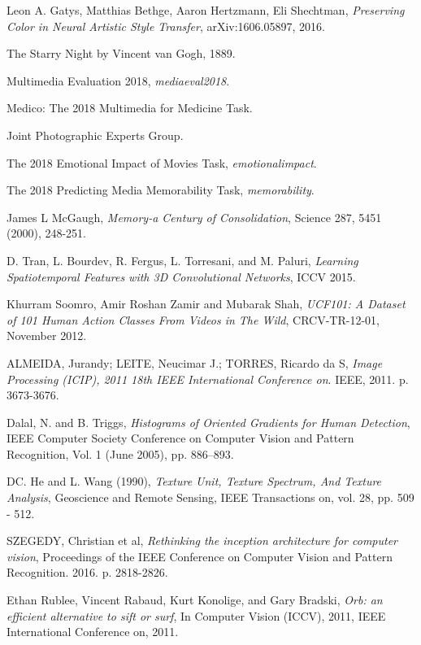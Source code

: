 \begin{thebibliography}{}
	Leon A. Gatys, Matthias Bethge, Aaron Hertzmann, Eli Shechtman,
    \emph{Preserving Color in Neural Artistic Style Transfer},
    arXiv:1606.05897, 2016.

	The Starry Night by Vincent van Gogh,
	1889.


	Multimedia Evaluation 2018,
    \emph{mediaeval2018}.

	Medico: The 2018 Multimedia for Medicine Task.

	Joint Photographic Experts Group.

	The 2018 Emotional Impact of Movies Task,
    \emph{emotionalimpact}.

	The 2018 Predicting Media Memorability Task,
	\emph{memorability}.

	James L McGaugh,
    \emph{Memory-a Century of Consolidation},
	Science 287, 5451 (2000), 248-251.

	D. Tran, L. Bourdev, R. Fergus, L. Torresani, and M. Paluri,
    \emph{Learning Spatiotemporal Features with 3D Convolutional Networks},
    ICCV 2015.

	Khurram Soomro, Amir Roshan Zamir and Mubarak Shah,
	\emph{UCF101: A Dataset of 101 Human Action Classes From Videos in The Wild},
	CRCV-TR-12-01,
	November 2012.

	ALMEIDA, Jurandy; LEITE, Neucimar J.; TORRES, Ricardo da S,
    \emph{Image Processing (ICIP), 2011 18th IEEE International Conference on}.
    IEEE, 2011. p. 3673-3676.

	Dalal, N. and B. Triggs,
    \emph{Histograms of Oriented Gradients for Human Detection},
    IEEE Computer Society Conference on Computer Vision and Pattern Recognition, Vol. 1 (June 2005), pp. 886–893.

	DC. He and L. Wang (1990),
    \emph{Texture Unit, Texture Spectrum, And Texture Analysis},
    Geoscience and Remote Sensing,
	IEEE Transactions on, vol. 28, pp. 509 - 512.

	SZEGEDY, Christian et al,
    \emph{Rethinking the inception architecture for computer vision},
    Proceedings of the IEEE Conference on Computer Vision and Pattern Recognition. 2016. p. 2818-2826.

	Ethan Rublee, Vincent Rabaud, Kurt Konolige, and Gary Bradski,
    \emph{Orb: an efficient alternative to sift or surf},
    In Computer Vision (ICCV), 2011,
	IEEE International Conference on, 2011.


\end{thebibliography}
